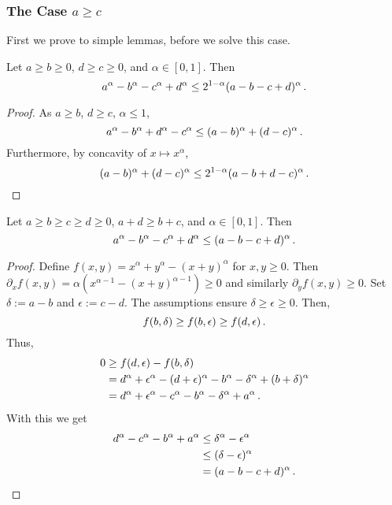 \subsubsection{The Case $a\geq c$}
%
First we prove to simple lemmas, before we solve this case.
%
\begin{lemma}\label{lmm:f1}
	Let $a\geq b\geq 0 $, $d \geq c \geq 0$, and $\alpha\in[0,1]$.
	Then
	\begin{equation*}
		a^\alpha-b^\alpha-c^\alpha+d^\alpha \leq 2^{1-\alpha}(a-b-c+d)^{\alpha}
		\, .
	\end{equation*}
\end{lemma}
%
\begin{proof}
	As $a\geq b$, $d\geq c$, $\alpha\leq 1$,
	\begin{equation*}
		a^\alpha-b^\alpha + d^\alpha-c^\alpha \leq (a-b)^\alpha + (d-c)^\alpha \, .
	\end{equation*}
	Furthermore, by concavity of $x \mapsto x^\alpha$,
	\begin{equation*}
		(a-b)^\alpha + (d-c)^\alpha
		\leq
		2^{1-\alpha}(a-b+d-c)^\alpha
		\, .
	\end{equation*}
\end{proof}
%
\begin{lemma}\label{lmm:f2}
	Let $a\geq b\geq c \geq d\geq 0$, $a+d\geq b+c$, and $\alpha\in[0,1]$.
	Then
	\begin{equation*}
		a^\alpha-b^\alpha-c^\alpha+d^\alpha \leq (a-b-c+d)^{\alpha}
		\, .
	\end{equation*}
\end{lemma}
%
\begin{proof}
	Define $f(x,y) = x^\alpha+y^\alpha-(x+y)^\alpha$ for $x,y\geq0$.
	Then $\partial_xf(x,y) = \alpha(x^{\alpha-1}-(x+y)^{\alpha-1}) \geq 0$ and similarly $\partial_yf(x,y) \geq 0$.
	Set $\delta := a-b$ and $\epsilon := c-d$. The assumptions ensure $\delta\geq\epsilon\geq0$.
	Then, 
	\begin{equation*}
		f(b,\delta) \geq f(b,\epsilon) \geq f(d,\epsilon)
		\, .
	\end{equation*}
	Thus,
	\begin{align*}
		0 
		&\geq 
		f(d,\epsilon) - f(b,\delta) 
		\\&= 
		d^\alpha+\epsilon^\alpha-(d+\epsilon)^\alpha
		-b^\alpha-\delta^\alpha+(b+\delta)^\alpha
		\\&=
		d^\alpha+\epsilon^\alpha-c^\alpha
		-b^\alpha-\delta^\alpha+a^\alpha
		\, .
	\end{align*}
	With this we get
	\begin{align*}
		d^\alpha-c^\alpha-b^\alpha+a^\alpha
		&\leq
		\delta^\alpha-\epsilon^\alpha
		\\&\leq 
		(\delta-\epsilon)^\alpha
		\\&=
		(a-b-c+d)^\alpha
		\, .
	\end{align*}
\end{proof}%
